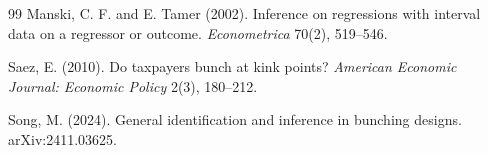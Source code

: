 \documentclass[11pt]{article}
\theoremstyle{definition}
\theoremstyle{plain}
\theoremstyle{remark}
\begin{document}
\begin{thebibliography}{99}
Manski, C. F. and E. Tamer (2002).
Inference on regressions with interval data on a regressor or outcome.
\emph{Econometrica} 70(2), 519--546.

Saez, E. (2010).
Do taxpayers bunch at kink points?
\emph{American Economic Journal: Economic Policy} 2(3), 180--212.

Song, M. (2024).
General identification and inference in bunching designs.
arXiv:2411.03625.
\end{thebibliography}
\end{document}

